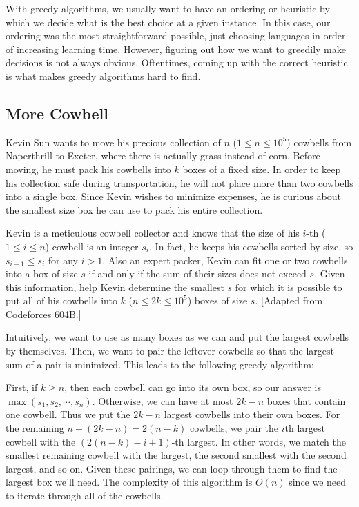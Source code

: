 With greedy algorithms, we usually want to have an ordering or heuristic by which we decide what is the best choice at a given instance. In this case, our ordering was the most straightforward possible, just choosing languages in order of increasing learning time. However, figuring out how we want to greedily make decisions is not always obvious. Oftentimes, coming up with the correct heuristic is what makes greedy algorithms hard to find.

\subsection{More Cowbell}

\begin{typewriter}
  Kevin Sun wants to move his precious collection of $n$ ($1\le n\le 10^5$) cowbells from Naperthrill to Exeter, where there is actually grass instead of corn. Before moving, he must pack his cowbells into $k$ boxes of a fixed size. In order to keep his collection safe during transportation, he will not place more than two cowbells into a single box. Since Kevin wishes to minimize expenses, he is curious about the smallest size box he can use to pack his entire collection.

  Kevin is a meticulous cowbell collector and knows that the size of his $i$-th ($1\le i\le n$) cowbell is an integer $s_i$. In fact, he keeps his cowbells sorted by size, so $s_{i - 1}\le s_i$ for any $i > 1$. Also an expert packer, Kevin can fit one or two cowbells into a box of size $s$ if and only if the sum of their sizes does not exceed $s$. Given this information, help Kevin determine the smallest $s$ for which it is possible to put all of his cowbells into $k$ ($n\le 2k\le 10^5$) boxes of size $s$. [Adapted from \href{http://codeforces.com/problemset/problem/604/B}{Codeforces 604B}.]
\end{typewriter}

Intuitively, we want to use as many boxes as we can and put the largest cowbells by themselves. Then, we want to pair the leftover cowbells so that the largest sum of a pair is minimized. This leads to the following greedy algorithm:

First, if $k \ge n$, then each cowbell can go into its own box, so our answer is $\max(s_1, s_2, \cdots, s_n)$. Otherwise, we can have at most $2k-n$ boxes that contain one cowbell. Thus we put the $2k-n$ largest cowbells into their own boxes. For the remaining $n-(2k-n) = 2(n-k)$ cowbells, we pair the $i$th largest cowbell with the $(2(n-k) - i + 1)$-th largest. In other words, we match the smallest remaining cowbell with the largest, the second smallest with the second largest, and so on. Given these pairings, we can loop through them to find the largest box we'll need. The complexity of this algorithm is $O(n)$ since we need to iterate through all of the cowbells.

